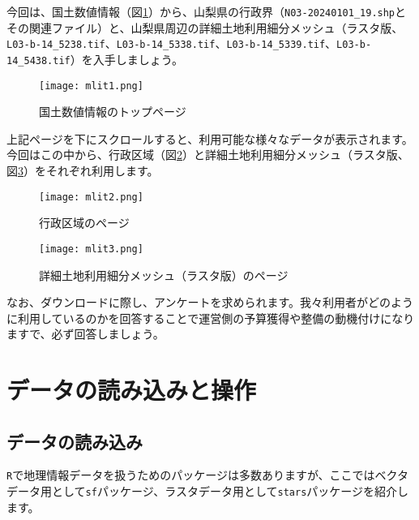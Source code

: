 今回は、国土数値情報（図\ref{mlit1}）から、山梨県の行政界（\verb|N03-20240101_19.shp|とその関連ファイル）と、山梨県周辺の詳細土地利用細分メッシュ（ラスタ版、\verb|L03-b-14_5238.tif|、\verb|L03-b-14_5338.tif|、\verb|L03-b-14_5339.tif|、\verb|L03-b-14_5438.tif|）を入手しましょう。

\begin{figure}[htb]
\begin{center}
\graphicspath{{2_gis/figs/}}
\texttt{[image: mlit1.png]}\\
\caption{国土数値情報のトップページ}
\label{mlit1}
\end{center}
\end{figure}

上記ページを下にスクロールすると、利用可能な様々なデータが表示されます。今回はこの中から、行政区域（図\ref{mlit2}）と詳細土地利用細分メッシュ（ラスタ版、図\ref{mlit3}）をそれぞれ利用します。

\begin{figure}[htb]
\begin{center}
\graphicspath{{2_gis/figs/}}
\texttt{[image: mlit2.png]}\\
\caption{行政区域のページ}
\label{mlit2}
\end{center}
\end{figure}

\begin{figure}[htb]
\begin{center}
\graphicspath{{2_gis/figs/}}
\texttt{[image: mlit3.png]}\\
\caption{詳細土地利用細分メッシュ（ラスタ版）のページ}
\label{mlit3}
\end{center}
\end{figure}

なお、ダウンロードに際し、アンケートを求められます。我々利用者がどのように利用しているのかを回答することで運営側の予算獲得や整備の動機付けになりますで、必ず回答しましょう。

\section{データの読み込みと操作}
  \subsection{データの読み込み}
\verb|R|で地理情報データを扱うためのパッケージは多数ありますが、ここではベクタデータ用として\verb|sf|パッケージ、ラスタデータ用として\verb|stars|パッケージを紹介します。

